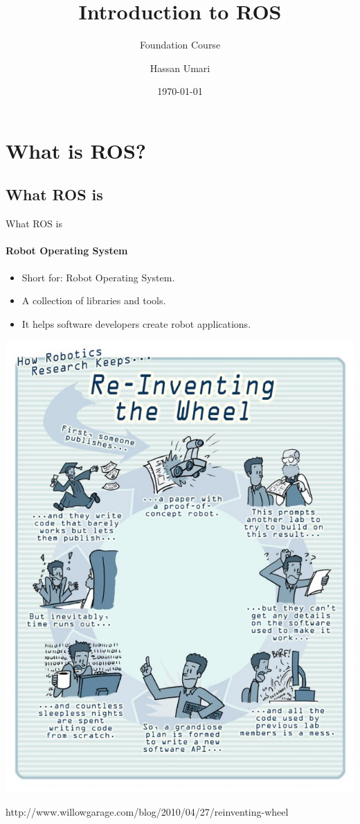 \documentclass{beamer}
\author[MAS]{Hassan Umari}
\title{Introduction to ROS}
\subtitle{Foundation Course}
\institute[HBRS]{Hochschule Bonn-Rhein-Sieg}
\date{\today}
\begin{document}
{
\begin{frame}
\titlepage
\end{frame}
}


\section{What is ROS?}


\subsection{What ROS is}
\begin{frame}{What ROS is}
\framesubtitle{Robot Operating System}
    \begin{itemize}
        \item Short for: Robot Operating System.
        \item A collection of libraries and tools.
        \item It helps software developers create robot
        applications. 
    \end{itemize}
\end{frame}



\begin{frame}[plain]{}
    \centering
    \includegraphics[width=.66\linewidth]{figures/stop_reinventing_theWheel.jpg}
    
\tiny{http://www.willowgarage.com/blog/2010/04/27/reinventing-wheel}
\end{frame}
\end{document}
